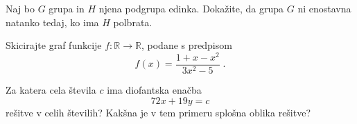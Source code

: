 \documentclass{izpit}
\begin{document}
  \podnaloga[10]
    Naj bo $G$ grupa in $H$ njena podgrupa edinka. Dokažite, da grupa $G$ ni
    enostavna natanko tedaj, ko ima $H$ polbrata.

  \prostor

\naloga[\tocke{25}]
  Skicirajte graf funkcije $f \colon \mathbb{R} \to \mathbb{R}$, podane s
  predpisom
  \[
    f(x) = \frac{1 + x - x^2}{3 x^2 - 5} \;.
  \]



  Za katera cela števila $c$ ima diofantska enačba
  \[
    72 x + 19 y = c
  \]
  rešitve v celih številih? Kakšna je v tem primeru splošna oblika rešitve?
\end{document}
